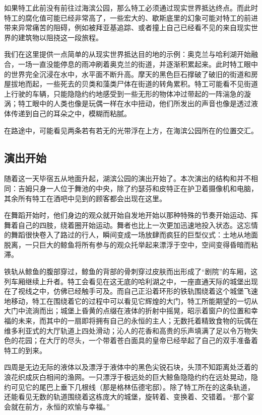 如果特工此前没有前往过海滨公园，那么特工必须通过现实世界抵达终点。而此时特工的腐化值可能已经非常高了，一些宏大的、歇斯底里的幻象可能对特工的前进带来异常痛苦的阻碍，例如被拜亚基追踪、或者撞上自己已经看不见的来自现实世界的建筑物以阻挠这一段旅程。

我们在这里提供一点简单的从现实世界抵达目的地的示例：奥克兰与哈利湖开始融合，一场一直没能停息的雨冲刷着奥克兰的街道，并逐渐积累起来。此时特工眼中的世界完全沉浸在水中，水平面不断升高。摩天的黑色巨石撑破了破旧的街道和房屋拔地而起，一些死去的贝类和藻类尸体在街道的转角累积。特工可能看不见街道上行驶的车辆，只能隐隐约约地感受到一些无形的物体冲过带起的一阵湍急的漩涡；特工眼中的人类也像是玩偶一样在水中扭动，他们所发出的声音也像是透过液体传递到自己的耳朵之中，模糊而粘腻。

在路途中，可能看见两条若有若无的光带浮在上方，在海滨公园所在的位置交汇。

\subsection{演出开始}

随着这一天毕宿五从地面升起，湖滨公园的演出开始了。本次演出的结构和并不相同：吉姆只身一人位于舞池的中央，除了约瑟芬和皮特正在护卫着摄像机和电脑，其余所有特工在酒吧中见到的顾客都会出现在这里。

在舞蹈开始时，他们身边的观众就开始自发地开始以那种特殊的节奏开始运动、挥舞着自己的四肢，绕着圈开始运动。舞者也比上一次更加迅速地投入状态。这忘情的舞蹈很快卷入了路过的行人，瞬间变成一场放肆而疯狂的巨型仪式：土地从地面脱离，一只巨大的鲸鱼将所有参与的观众托举起来漂浮于空中，空间变得昏暗而粘滞。

铁轨从鲸鱼的腹部穿过，鲸鱼的背部的骨刺穿过皮肤而出形成了“剧院”的车厢，这列车厢继续上升者。特工会看见在这无底的哈利湖之中，一座直通天际的城堡出现在了视线之中，仿佛已经触手可及。而自己正沿着环形的铁轨围绕着这个城堡飞速地移动，特工在围绕着它的过程中可以看见它辉煌的大门，特工所能期望的一切从大门中流淌而出；城堡上昏黄的点缀在液体的折射中摇晃，昭示着窗户的位置和幸福的未来，而其中的一扇即将拥有自己的永恒的主人；无数托着精致食物的玩偶在维多利亚式的大厅轨道上四处滑动；沁人的花香和高贵的乐声填满了足以令万物失色的花园；在大厅的尽头，一个带着苍白面具的皇帝已经举起了自己的双手准备着特工的到来。

四周是无边无际的液体以及漂浮于液体中的黑色尖锐石块，头顶不知距离处泛着的浪花织成灰白相间的渔网。一只漂浮于极远处的巨大鲸鱼隐隐约约在远处晃动，隐约可见它的尾巴上垂下几根线（那是格林伍德宅邸）。除了特工所在的这条轨道，还能看见无数的轨道围绕着这栋庞大的城堡，旋转着、变换着、交错着。“那个宴会就在前方，永恒的欢愉与幸福。”


